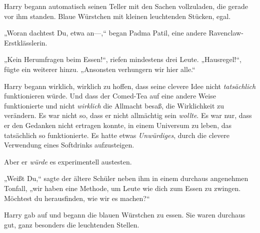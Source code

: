 Harry begann automatisch seinen Teller mit den Sachen vollzuladen, die gerade vor ihm standen. Blaue Würstchen mit kleinen leuchtenden Stücken, egal.

„Woran dachtest Du, etwa an—,“ began Padma Patil, eine andere Ravenclaw-Erstklässlerin.

„Kein Herumfragen beim Essen!“, riefen mindestens drei Leute. „Hausregel!“, fügte ein weiterer hinzu. „Ansonsten verhungern wir hier alle.“

Harry begann wirklich, wirklich zu hoffen, dass seine clevere Idee nicht \emph{tatsächlich} funktionieren würde. Und dass der Comed-Tea auf eine andere Weise funktionierte und nicht \emph{wirklich} die Allmacht besaß, die Wirklichkeit zu verändern. Es war nicht so, dass er nicht allmächtig sein \emph{wollte}. Es war nur, dass er den Gedanken nicht ertragen konnte, in einem Universum zu leben, das tatsächlich so funktionierte. Es hatte etwas \emph{Unwürdiges}, durch die clevere Verwendung eines Softdrinks aufzusteigen.

Aber er \emph{würde} es experimentell austesten.

„Weißt Du,“ sagte der ältere Schüler neben ihm in einem durchaus angenehmen Tonfall, „wir haben eine Methode, um Leute wie dich zum Essen zu zwingen. Möchtest du herausfinden, wie wir es machen?“

Harry gab auf und begann die blauen Würstchen zu essen. Sie waren durchaus gut, ganz besonders die leuchtenden Stellen.

